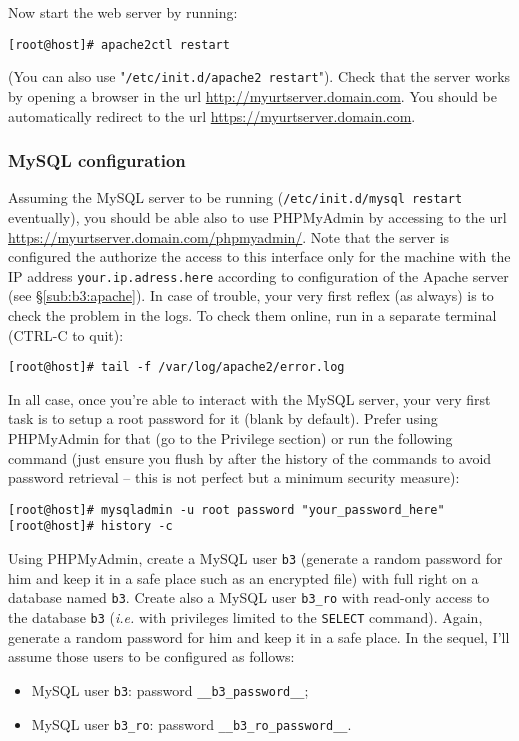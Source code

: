 \noindent Now start the web server by running:
\begin{lstlisting}[style=command]
[root@host]# apache2ctl restart
\end{lstlisting}
(You can also use "\texttt{/etc/init.d/apache2 restart}"). Check that the server
works by opening a browser in the url \url{http://myurtserver.domain.com}. 
You should be automatically redirect to the url
\url{https://myurtserver.domain.com}.  

\subsubsection{MySQL configuration}
\label{sub:b3:mysql}

Assuming the MySQL server to be running (\texttt{/etc/init.d/mysql restart}
eventually), you should be able also to use PHPMyAdmin by accessing to the url 
\url{https://myurtserver.domain.com/phpmyadmin/}.
Note that the server is configured the authorize the access to this interface
only for the machine with the IP address \texttt{your.ip.adress.here} according
to configuration of the Apache server (see \S\ref{sub:b3:apache}). 
In case of trouble, your very first reflex (as always) is to check the problem
in the logs. To check them online, run in a separate terminal (CTRL-C to quit): 
\begin{lstlisting}[style=command]
[root@host]# tail -f /var/log/apache2/error.log
\end{lstlisting}

In all case, once you're able to interact with the MySQL server, your very first
task is to setup a root password for it (blank by default). 
Prefer using PHPMyAdmin for that (go to the Privilege section) or run the
following command (just ensure you flush by after the history of the commands to
avoid password retrieval -- this is not perfect but a minimum security measure):
\begin{lstlisting}[style=command]
[root@host]# mysqladmin -u root password "your_password_here"
[root@host]# history -c
\end{lstlisting}

Using PHPMyAdmin, create a MySQL user \texttt{b3} (generate a random password
for him and keep it in a safe place such as an encrypted file) with full right
on a database named \texttt{b3}. 
Create also a MySQL user \texttt{b3\_ro} with read-only access to the database
\texttt{b3} (\emph{i.e.} with privileges limited to the \texttt{SELECT}
command). Again, generate a random password for him and keep it in a safe
place. 
In the sequel, I'll assume those users to be configured as follows: 
\begin{itemize}\setitemsep
\item MySQL user \texttt{b3}: password \texttt{\_\_b3\_password\_\_};
\item MySQL user \texttt{b3\_ro}: password \texttt{\_\_b3\_ro\_password\_\_}.
\end{itemize}
 
